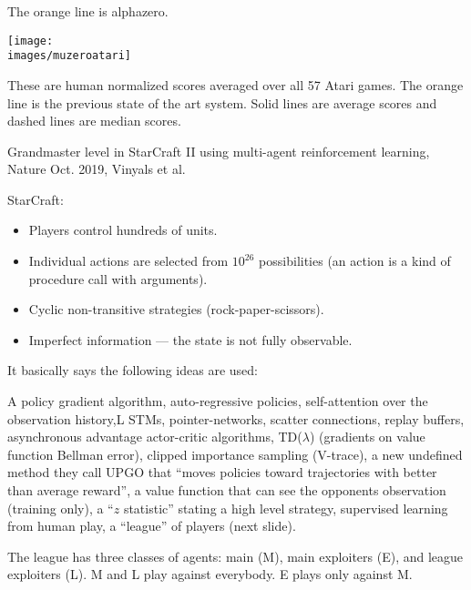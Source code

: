 {{The orange line is alphazero.
}


\centerline{\texttt{[image: \\images/muzeroatari]}}

{\huge
  These are human normalized scores averaged over all 57 Atari games.  The orange line is the previous state of the art system.  Solid lines are average scores and dashed lines are median scores.
}



Grandmaster level in StarCraft II using multi-agent reinforcement learning, Nature Oct. 2019, Vinyals et al.

\vfill
StarCraft:

\begin{itemize}
\item Players control hundreds of units.

\vfill
\item Individual actions are selected from $10^{26}$ possibilities (an action is a kind of procedure call with arguments).

\vfill
\item Cyclic non-transitive strategies (rock-paper-scissors).

\vfill
\item Imperfect information --- the state is not fully observable.
\end{itemize}


It basically says the following ideas are used:

A policy gradient algorithm, auto-regressive policies, self-attention over the observation history,L STMs, pointer-networks, scatter connections,
replay buffers, asynchronous advantage actor-critic algorithms, TD($\lambda$) (gradients on value function Bellman error), clipped importance sampling
(V-trace), a new undefined method they call UPGO that ``moves policies toward trajectories with better than average reward'', a value function
that can see the opponents observation (training only), a ``$z$ statistic'' stating a high level strategy, 
supervised learning from human play, 
a ``league'' of players (next slide).


The league has three classes of agents: main (M), main exploiters (E), and league exploiters (L).  M and L play against everybody.
E plays only against M.


}
